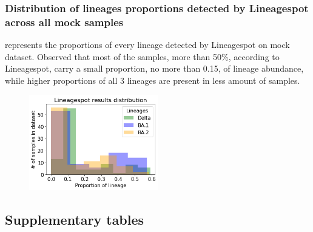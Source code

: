        \subsubsection{Distribution of lineages proportions detected by Lineagespot across all mock samples}  
         represents the proportions of every lineage detected by Lineagespot on mock dataset. Observed that most of the samples, more than 50\%, according to Lineagespot, carry a small proportion, no more than 0.15, of lineage abundance, while higher proportions of all 3 lineages are present in less amount of samples.
        \begin{figure}[H]
        	\centering
            \includegraphics[width=0.5\textwidth]{figures/further/distr-lineagespot.png}
            \label{fig:further:dist-ls}
        \end{figure}
        
    \subsection{Supplementary tables}
